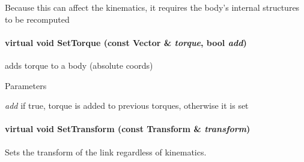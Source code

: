 Because this can affect the kinematics, it requires the body's internal structures to be recomputed \hypertarget{classOpenRAVE_1_1KinBody_1_1Link_ac06ccbc6d023627b4032dc3b41beaf93}{
\paragraph[{SetTorque}]{\setlength{\rightskip}{0pt plus 5cm}virtual void SetTorque (const Vector \& {\em torque}, \/  bool {\em add})}\hfill}
\label{classOpenRAVE_1_1KinBody_1_1Link_ac06ccbc6d023627b4032dc3b41beaf93}
adds torque to a body (absolute coords) 
\begin{DoxyParams}{Parameters}
\item[{\em add}]if true, torque is added to previous torques, otherwise it is set \end{DoxyParams}
\hypertarget{classOpenRAVE_1_1KinBody_1_1Link_a92abef33e0bc4eca1756178c31e18645}{
\paragraph[{SetTransform}]{\setlength{\rightskip}{0pt plus 5cm}virtual void SetTransform (const Transform \& {\em transform})}\hfill}
\label{classOpenRAVE_1_1KinBody_1_1Link_a92abef33e0bc4eca1756178c31e18645}


Sets the transform of the link regardless of kinematics. 


